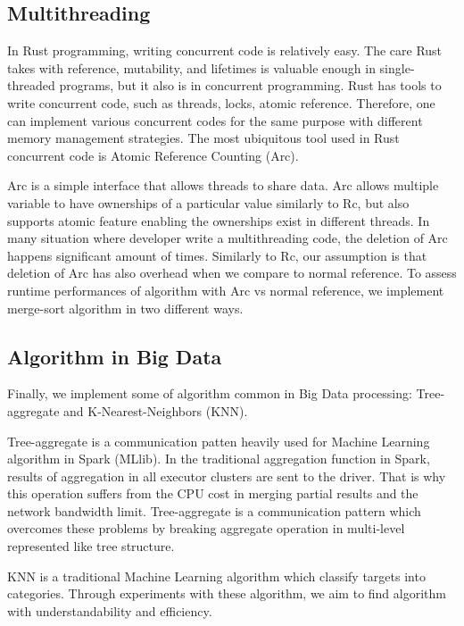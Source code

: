 \subsection{Multithreading}
\label{sec:history}
In Rust programming, writing concurrent code is relatively easy. The care Rust takes with reference, mutability, and lifetimes is valuable enough in single-threaded programs, 
but it also is in concurrent programming. Rust has tools to write concurrent code, such as threads, locks, atomic reference. 
Therefore, one can implement various concurrent codes for the same purpose with different memory management strategies. 
The most ubiquitous tool used in Rust concurrent code is Atomic Reference Counting (Arc). 

Arc is a simple interface that allows threads to share data. Arc allows multiple variable to have ownerships of a particular value similarly to Rc, 
but also supports atomic feature enabling the ownerships exist in different threads. 
In many situation where developer write a multithreading code, the deletion of Arc happens significant amount of times. 
Similarly to Rc, our assumption is that deletion of Arc has also overhead when we compare to normal reference. 
To assess runtime performances of algorithm with Arc vs normal reference, we implement merge-sort algorithm in two different ways. 

\subsection{Algorithm in Big Data}
\label{sec:history}
Finally, we implement some of algorithm common in Big Data processing: Tree-aggregate and K-Nearest-Neighbors (KNN). 

Tree-aggregate is a communication patten heavily used for Machine Learning algorithm in Spark (MLlib). 
In the traditional aggregation function in Spark, results of aggregation in all executor clusters are sent to the driver. 
That is why this operation suffers from the CPU cost in merging partial results and the network bandwidth limit.
Tree-aggregate is a communication pattern which overcomes these problems by breaking aggregate operation in multi-level represented like tree structure.

KNN is a traditional Machine Learning algorithm which classify targets into categories. 
Through experiments with these algorithm, we aim to find algorithm with understandability and efficiency. 
\clearpage
